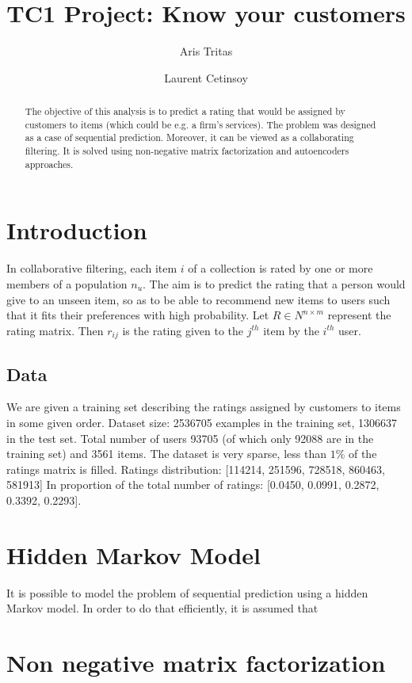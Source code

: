 \documentclass[10pt,twocolumn]{article}
\title{TC1 Project: Know your customers}
\author{Aris Tritas \and Laurent Cetinsoy}
\begin{document}
\maketitle

\begin{abstract}

The objective of this analysis is to predict a rating that would be assigned by customers to items (which could be e.g. a firm's services). 
The problem was designed as a case of sequential prediction. Moreover, it can be viewed as a collaborating filtering. It is solved using non-negative matrix factorization and autoencoders approaches.

\end{abstract}

\section{Introduction}

In collaborative filtering, each item $i$ of a collection is rated by one or more members of a population $n_u$. The aim is to predict the rating that a person would give to an unseen item, so as to be able to recommend new items to users such that it fits their preferences with high probability.
Let $R \in N^{ n \times m}$ represent the rating matrix. 
Then $r_{ij}$ is the rating given to the $j^{th}$ item by the $i^{th}$ user.

\subsection{Data}
We are given a training set describing the ratings assigned by customers to items in some given order.
Dataset size: 2536705 examples in the training set, 1306637 in the test set. Total number of users 93705 (of which only 92088 are in the training set) and 3561 items. The dataset is very sparse,  less than $1\% $ of the ratings matrix is filled.
Ratings distribution: [114214, 251596, 728518, 860463, 581913] In proportion of the total number of ratings: [0.0450, 0.0991, 0.2872, 0.3392, 0.2293].

\section{Hidden Markov Model}
It is possible to model the problem of sequential prediction using a hidden Markov model. In order to do that efficiently, it is assumed that 
\section{Non negative matrix factorization}
\end{document}
